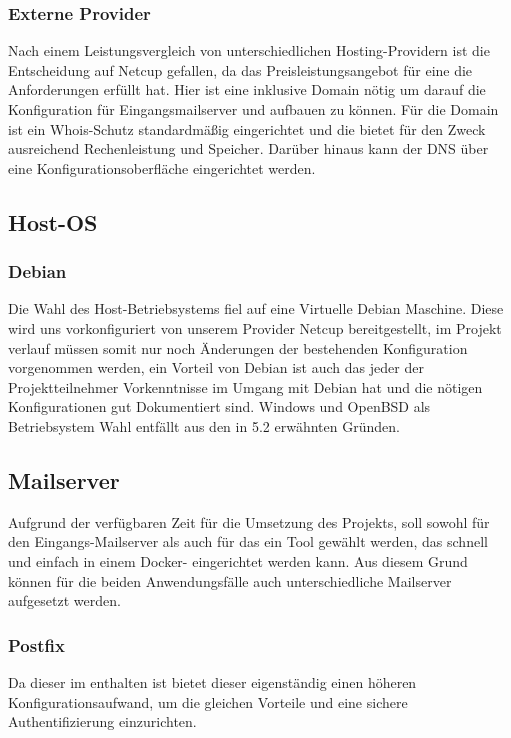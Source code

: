 \documentclass[a4paper,11pt,singlespacing]{article}
\begin{document}
		\subsubsection{Externe Provider}\label{sec:AuswahlLösungExterneProvider}
			Nach einem Leistungsvergleich von unterschiedlichen Hosting-Providern ist die Entscheidung auf \textsf{Netcup} gefallen, da das Preisleistungsangebot für eine  die Anforderungen erfüllt hat.
			Hier ist eine  inklusive Domain nötig um darauf die Konfiguration für Eingangsmailserver und  aufbauen zu können.
			Für die Domain ist ein Whois-Schutz standardmäßig eingerichtet und die  bietet für den Zweck ausreichend Rechenleistung und Speicher. Darüber hinaus kann der DNS über eine Konfigurationsoberfläche eingerichtet werden.
			
			

	\subsection{Host-OS}\label{sec:AuswahlLösungHost-Maschine}
		\subsubsection{Debian}\label{sec:Debian}
			Die Wahl des Host-Betriebsystems fiel auf eine Virtuelle Debian Maschine.
			Diese wird uns vorkonfiguriert von unserem Provider Netcup bereitgestellt, im Projekt verlauf müssen somit nur noch Änderungen der bestehenden Konfiguration vorgenommen werden, ein Vorteil von Debian ist auch das jeder der Projektteilnehmer Vorkenntnisse im Umgang mit Debian hat und die nötigen Konfigurationen gut Dokumentiert sind.
Windows und OpenBSD als Betriebsystem Wahl entfällt aus den in 5.2 erwähnten Gründen.

	\subsection{Mailserver}\label{sec:AuswahlLösungMailserver}
		Aufgrund der verfügbaren Zeit für die Umsetzung des Projekts, soll sowohl für den Eingangs-Mailserver als auch für das  ein Tool gewählt werden, das schnell und einfach in einem Docker-	eingerichtet werden kann. Aus diesem Grund können für die beiden Anwendungsfälle auch unterschiedliche Mailserver aufgesetzt werden.
		
		\subsubsection{Postfix}\label{sec:AuswahlLösungPostfix}	
			Da dieser im  enthalten ist bietet dieser eigenständig einen höheren Konfigurationsaufwand, um die gleichen Vorteile und eine sichere Authentifizierung einzurichten.
			
\end{document}
